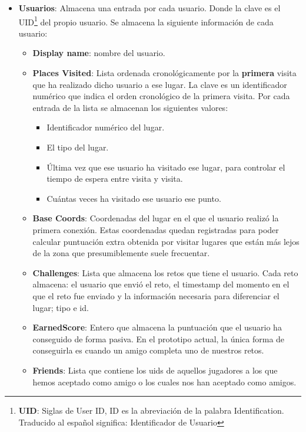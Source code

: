 \begin{itemize}
\item \textbf{Usuarios}: Almacena una entrada por cada usuario. Donde la clave es el UID\footnote{\textbf{UID}: Siglas de User ID, ID es la abreviación de la palabra Identification. Traducido al español significa: Identificador de Usuario} del propio usuario. Se almacena la siguiente información de cada usuario:
    \begin{itemize}
    \item \textbf{Display name}: nombre del usuario.
    \item \textbf{Places Visited}: Lista ordenada cronológicamente por la \textbf{primera} visita que ha realizado dicho usuario a ese lugar. La clave es un identificador numérico que indica el orden cronológico de la primera visita. Por cada entrada de la lista se almacenan los siguientes valores:
        \begin{itemize}
        \item Identificador numérico del lugar.
        \item El tipo del lugar.
        \item Última vez que ese usuario ha visitado ese lugar, para controlar el tiempo de espera entre visita y visita.
        \item Cuántas veces ha visitado ese usuario ese punto.
        \end{itemize}
    \item \textbf{Base Coords}: Coordenadas del lugar en el que el usuario realizó la primera conexión. Estas coordenadas quedan registradas para poder calcular puntuación extra obtenida por visitar lugares que están más lejos de la zona que presumiblemente suele frecuentar.
    
    \item \textbf{Challenges}: Lista que almacena los retos que tiene el usuario. Cada reto almacena: el usuario que envió el reto, el timestamp del momento en el que el reto fue enviado y la información necesaria para diferenciar el lugar; tipo e id.
    
    \item \textbf{EarnedScore}: Entero que almacena la puntuación que el usuario ha conseguido de forma pasiva. En el prototipo actual, la única forma de conseguirla es cuando un amigo completa uno de nuestros retos.
    
    \item \textbf{Friends}: Lista que contiene los uids de aquellos jugadores a los que hemos aceptado como amigo o los cuales nos han aceptado como amigos.
    

\end{itemize}
\end{itemize}
